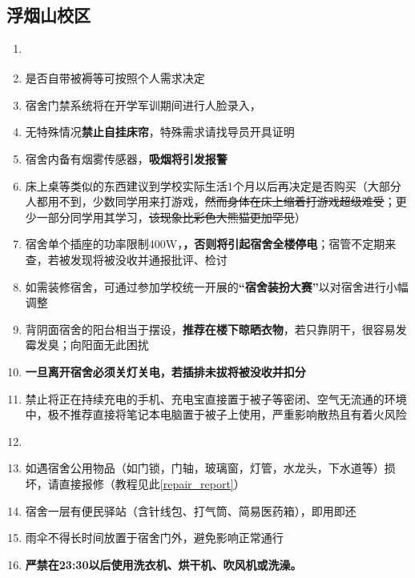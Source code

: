 \subsection[浮烟山校区]{浮烟山校区}
\begin{enumerate}
      \item \textbf{}
            \label{random_allocation}
      \item 是否自带被褥等可按照个人需求决定\footnotemark
      \item 宿舍门禁系统将在开学军训期间进行人脸录入，\textbf{}
      \item 无特殊情况\textbf{禁止自挂床帘}，特殊需求请找导员开具证明
      \item 宿舍内备有烟雾传感器，\textbf{吸烟将引发报警\footnotemark}
      \item 床上桌等类似的东西建议到学校实际生活1个月以后再决定是否购买（大部分人都用不到，少数同学用来打游戏，\sout{然而身体在床上缩着打游戏超级难受}；更少一部分同学用其学习，\sout{该现象\linebreak[3]比彩色大熊猫更加罕见}）
      \item 宿舍单个插座的功率限制400W\footnotemark，\textbf{}\linebreak[3]\textbf{，否则将引起宿舍全楼停电}；宿管不定期来查，若被发现将被没收并通报批评、检讨
      \item 如需装修宿舍，可通过参加学校统一开展的\textbf{“宿舍装扮大赛”}\footnotemark 以对宿舍进行小幅调整
      \item 背阴面宿舍的阳台相当于摆设，\textbf{推荐在楼下晾晒衣物}，若只靠阴干，很容易发霉发臭；向阳面无此困扰
      \item \textbf{一旦离开宿舍必须关灯关电，若插排未拔将被没收并扣分}
      \item 禁止将正在持续充电的手机、充电宝直接置于被子等密闭、空气无流通的环境中，极不推荐直接将笔记本电脑置于被子上使用，严重影响散热且有着火风险
      \item \textbf{}\footnotemark
      \item 如遇宿舍公用物品（如门锁，门轴，玻璃窗，灯管，水龙头，下水道等）损坏，请直接报修（教程见此\uline{\ref{repair_report}}）
      \item 宿舍一层有便民驿站（含针线包、打气筒、简易医药箱），即用即还
      \item 雨伞不得长时间放置于宿舍门外，避免影响正常通行
      \item \textbf{严禁在23:30以后使用洗衣机、烘干机、吹风机或洗澡。}
\end{enumerate}

